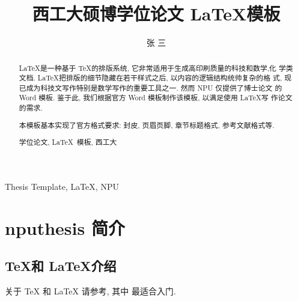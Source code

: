 \documentclass[twoside, UTF8, phd]{nputhesis}
\title[\LaTeX\ Template of NPU Thesis]{西工大硕博学位论文 \LaTeX 模板}
\author[San Zhang]{张\,\,三}
\theoremstyle{npuplain}
\theoremstyle{nputheorem}
\begin{document}
\makecover    %

\frontmatter  %

\begin{abstract}
  \LaTeX 是一种基于 \TeX 的排版系统, 它非常适用于生成高印刷质量的科技和数学,化
  学类文档. \LaTeX 把排版的细节隐藏在若干样式之后, 以内容的逻辑结构统帅复杂的格
  式, 现已成为科技文写作特别是数学写作的重要工具之一. 然而 NPU 仅提供了博士论文
  的 Word 模板. 鉴于此, 我们根据官方 Word 模板制作该模板, 以满足使用 \LaTeX 写
  作论文的需求.

  本模板基本实现了官方格式要求: 封皮, 页眉页脚, 章节标题格式, 参考文献格式等.

  \lipsum[1-5]
  \begin{keywords}
    学位论文, \LaTeX\ 模板, 西工大
  \end{keywords}
\end{abstract}

\begin{Abstract}
  \lipsum[1-4]
  \begin{Keywords}
    Thesis Template, \LaTeX, NPU
  \end{Keywords}
\end{Abstract}

\tableofcontents    %
\printnomenclature  %

\mainmatter         %


\chapter{nputhesis 简介}

\section{\TeX 和 \LaTeX 介绍}
关于 \TeX\cite{Knuth1986} 和 \LaTeX\cite{Lamport1994} 请参考\parencite{Knuth1986,Lamport1994,Liu2013}, 
其中 \parencite{Liu2013} 最适合入门.
\end{document}

